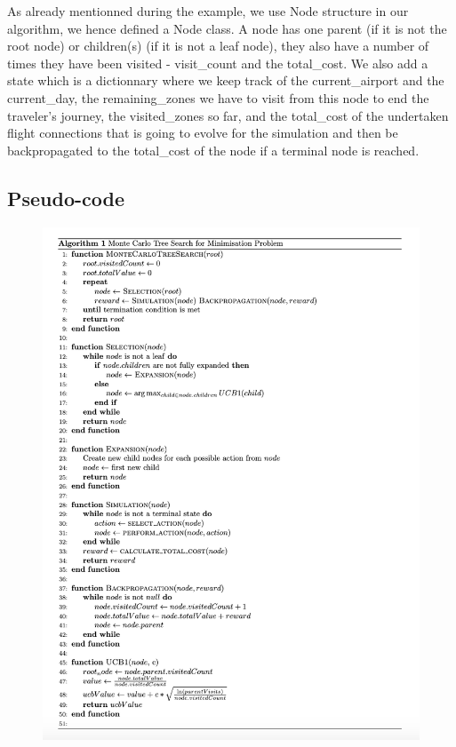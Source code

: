 As already mentionned during the example, we use Node structure in our algorithm, we hence defined a Node class.
A node has one parent (if it is not the root node) or children(s) (if it is not a leaf node), they also have a number of times they have been visited - visit\_count and the total\_cost.
We also add a state which is a dictionnary where we keep track of the current\_airport and the current\_day, the remaining\_zones we have to visit from this node to end the traveler's journey, the visited\_zones so far, and the total\_cost of the undertaken flight connections that is going to evolve for the simulation and then be backpropagated to the total\_cost of the node if a terminal node is reached.

\newpage
\subsection{Pseudo-code}
\begin{figure}[!ht]
    \centering
    \includegraphics[width=1\textwidth]{Figures/Pseudo code.png}
\end{figure}
\newpage
